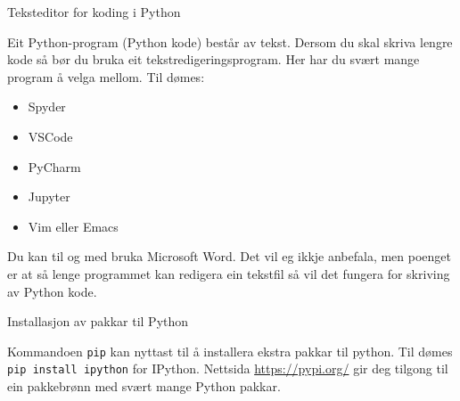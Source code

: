 \begin{frame}{Teksteditor for koding i Python}

  Eit Python-program (Python kode) består av tekst. Dersom du skal skriva lengre kode så bør du bruka eit tekstredigeringsprogram. Her har du svært mange program å velga mellom. Til dømes:
  
  \begin{itemize}
  \item Spyder
  \item VSCode
  \item PyCharm
  \item Jupyter
  \item Vim eller Emacs
  \end{itemize}
  
  Du kan til og med bruka Microsoft Word. Det vil eg ikkje anbefala, men poenget er at så lenge programmet kan redigera ein tekstfil så vil det fungera for skriving av Python kode.
\end{frame}


\begin{frame}{Installasjon av pakkar til Python}
	
	Kommandoen \texttt{pip} kan nyttast til å installera ekstra pakkar til python. Til dømes \texttt{pip install ipython} for IPython. Nettsida \url{https://pypi.org/} gir deg tilgong til ein pakkebrønn med svært mange Python pakkar.
	
\end{frame}


